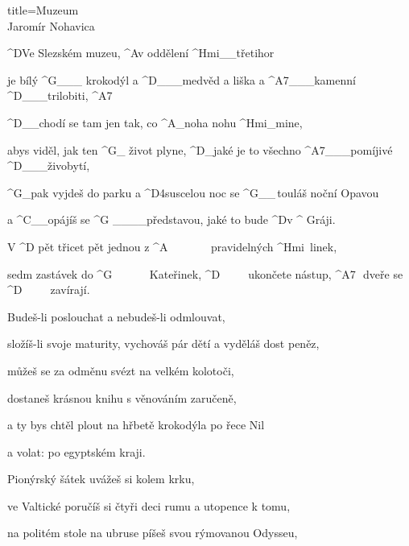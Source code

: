 \begin{song}{title=\predtitle\centering Muzeum \\\large Jaromír Nohavica  \vspace*{-0.3cm}}  %
\begin{centerjustified}

\sloka
	^{D}Ve Slezském muzeu, ^{A}v oddělení ^{Hmi{\color{white}\_\_}}třetihor
	
	je bílý ^{G{\color{white}\_\_\_}\,\,}krokodýl a ^{D{\color{white}\_\_\_}}medvěd a liška a ^{A7{\color{white}\_\_\_}}kamenní ^{D{\color{white}\_\_\_}}trilobiti, ^{A7}
	
	^{D{\color{white}\_\_}}chodí se tam jen tak, co ^{A{\color{white}\_}}noha nohu ^{Hmi{\color{white}\_}}mine, 
	
	abys viděl, jak ten ^{G{\color{white}\_}\,\,}život plyne, ^{D{\color{white}\_}}jaké je to všechno ^{A7{\color{white}\_\_\_}}pomíjivé ^{D{\color{white}\_\_\_}}živobytí,
	
	^{G{\color{white}\_}}pak vyjdeš do parku a ^{D4sus}celou noc se ^{G{\color{white}\_\_}\,}touláš noční Opavou

	a ^{C{\color{white}\_\_}}opájíš se ^{G\,\,{\color{white}\_\_\_\_}}představou, jaké to bude ^{D}v ^{\,\,G}ráji.
	

	V ^{D\,\,}pět třicet pět jednou z ^{A\,\,\,\,\,\,\,\,\,\,\,\,\,\,\,\,\,\,\,\,\,\,\,}pravidelných ^{Hmi\,\,\,}linek,
	
	sedm zastávek do ^{G\,\,\,\,\,\,\,\,\,\,\,\,\,\,\,\,\,\,\,\,}Kateřinek, ^{D\,\,\,\,\,\,\,\,\,\,\,\,\,\,\,}ukončete nástup, ^{A7\,\,\,\,}dveře se ^{D\,\,\,\,\,\,\,\,\,\,\,\,\,\,\,}zavírají.


\sloka
	Budeš-li poslouchat a nebudeš-li odmlouvat,
	
	složíš-li svoje maturity, vychováš pár dětí a vyděláš dost peněz,
	
	můžeš se za odměnu svézt na velkém kolotoči,
	
	dostaneš krásnou knihu s věnováním zaručeně,
	
	a ty bys chtěl plout na hřbetě krokodýla po řece Nil
	
	a volat:  po egyptském kraji.
	

\sloka
	Pionýrský šátek uvážeš si kolem krku,
	
	ve Valtické poručíš si čtyři deci rumu a utopence k tomu,
	
	na politém stole na ubruse píšeš svou rýmovanou Odysseu,
	

\end{centerjustified}
\end{song}
